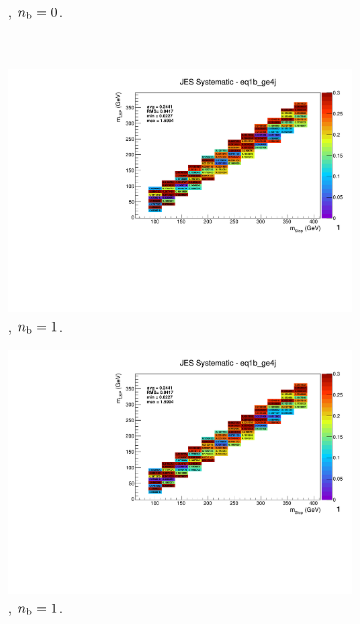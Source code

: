 \begin{figure}[ht!]
\begin{subfigure}[b]{0.32\textwidth}
    \caption{\njhigh, $n_{\text{b}} = 0$.}
    \label{fig:sms-jes-tdegen-ge4j-0b}
  \end{subfigure}\\
  \begin{subfigure}[b]{0.32\textwidth}
    \includegraphics[width=\textwidth, page=12]{Figs/sms/t2degen/v19_2/systs/T2_4body_JES_eq1b_ge4j.pdf}
    \caption{\njhigh, $n_{\text{b}} = 1$.}
  \end{subfigure}
  \begin{subfigure}[b]{0.32\textwidth}
    \includegraphics[width=\textwidth, page=8]{Figs/sms/t2degen/v19_2/systs/T2_4body_JES_eq1b_ge4j.pdf}
    \caption{\njhigh, $n_{\text{b}} = 1$.}
  \end{subfigure}
  \begin{subfigure}[b]{0.32\textwidth}

\end{subfigure}
\end{figure}
